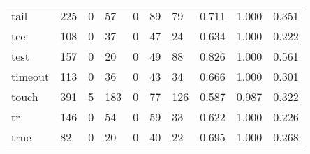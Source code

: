 \begin{longtable}{lp{1.3cm}p{1.3cm}p{1.3cm}p{1.3cm}p{1.3cm}p{1.3cm}p{1.3cm}p{1.3cm}p{1.3cm}}
tail      &                    225 &                                  0 &                                57 &                                0 &                                89 &                              79 &                                0.711 &                                  1.000 &                                0.351 \\
tee       &                    108 &                                  0 &                                37 &                                0 &                                47 &                              24 &                                0.634 &                                  1.000 &                                0.222 \\
test      &                    157 &                                  0 &                                20 &                                0 &                                49 &                              88 &                                0.826 &                                  1.000 &                                0.561 \\
timeout   &                    113 &                                  0 &                                36 &                                0 &                                43 &                              34 &                                0.666 &                                  1.000 &                                0.301 \\
touch     &                    391 &                                  5 &                               183 &                                0 &                                77 &                             126 &                                0.587 &                                  0.987 &                                0.322 \\
tr        &                    146 &                                  0 &                                54 &                                0 &                                59 &                              33 &                                0.622 &                                  1.000 &                                0.226 \\
true      &                     82 &                                  0 &                                20 &                                0 &                                40 &                              22 &                                0.695 &                                  1.000 &                                0.268 \\

\end{longtable}
